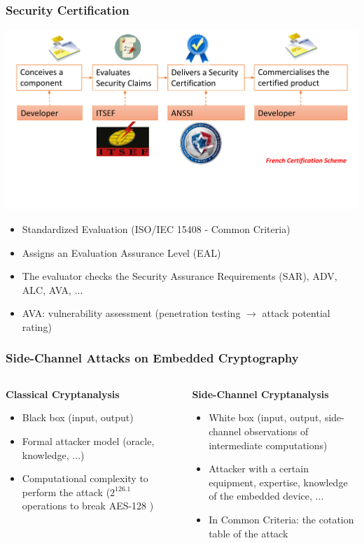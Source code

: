\begin{frame}
\frametitle{Security Certification}
\centering
\includegraphics[width = .9\textwidth]{figures/ITSEF_nobody.pdf}
\begin{itemize}
\item Standardized Evaluation (\eg ISO/IEC 15408 - Common Criteria)
\item Assigns an Evaluation Assurance Level (EAL)
\item The evaluator checks the Security Assurance Requirements (SAR), \eg ADV, ALC, AVA, ...
\item AVA: vulnerability assessment (penetration testing $\rightarrow$ attack potential rating)
\end{itemize}
\end{frame}

\begin{frame}
\frametitle{Side-Channel Attacks on Embedded Cryptography}

\begin{columns}
\begin{column}{.5\textwidth}
\textbf{Classical Cryptanalysis}
\begin{itemize}
\item Black box (input, output)
\item Formal attacker model (oracle, knowledge, ...)
\item Computational complexity to perform the attack (\eg $2^{126.1}$ operations to break AES-128 \cite{bogdanov})
\end{itemize}
\end{column}
\begin{column}{.5\textwidth}
\textbf{Side-Channel Cryptanalysis}
\begin{itemize}
\item White box (input, output, side-channel observations of intermediate computations)
\item Attacker with a certain equipment, expertise, knowledge of the embedded device, ...
\item In Common Criteria: the cotation table of the attack
\end{itemize}
\end{column}
\end{columns}
\end{frame}

